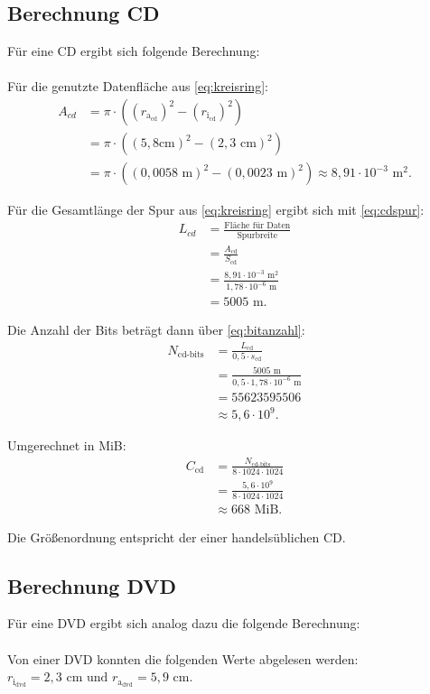\documentclass[9pt,twocolumn,twoside]{pnas-new}
\begin{document}
\subsection{Berechnung CD}
Für eine CD ergibt sich folgende Berechnung: \\ \\
Für die genutzte Datenfläche aus \eqref{eq:kreisring}:
\begin{align*}
 A_{cd} &= \pi\cdot((r_{\mbox{a}_{\mbox{cd}}})^2-(r_{\mbox{i}_{\mbox{cd}}})^2)\\	
&= \pi\cdot((5,8\mbox{cm})^2-(2,3\mbox{ cm})^2) \\
 &=  \pi\cdot((0,0058\mbox{ m})^2-(0,0023\mbox{ m})^2) \approx  8,91\cdot10^{-3}\mbox{ m}^2.
\end{align*}

Für die Gesamtlänge der Spur aus \eqref{eq:kreisring} ergibt sich mit \eqref{eq:cdspur}:
\begin{align*}
 L_{cd} &= \frac{\mbox{Fläche für Daten}}{\mbox{Spurbreite}}\\
 &= \frac{A_{\mbox{cd}}}{S_{\mbox{cd}}}\\
 &= \frac{8,91\cdot10^{-3}\mbox{ m}^2}{1,78\cdot10^{-6}\mbox{ m} }\\
 &= 5005\mbox{ m}.
\end{align*}

Die Anzahl der Bits beträgt dann über \eqref{eq:bitanzahl}:
\begin{align*}
N_{\mbox{cd-bits}} &=  \frac{L_{\mbox{cd}}}{0,5\cdot s_{\mbox{cd}}}\\
&= \frac{5005\mbox{ m}}{0,5 \cdot 1,78 \cdot 10^{-6}\mbox{ m}}\\
&= 55623595506 \\
&\approx 5,6 \cdot 10^9.
\end{align*}

Umgerechnet in MiB:
\begin{align*}
C_{\mbox{cd}} &= \frac{N_{\mbox{cd-bits}}}{8\cdot1024\cdot1024}\\
&= \frac{ 5,6\cdot10^9}{8\cdot1024\cdot1024}\\
&\approx 668\mbox{ MiB}.
\end{align*}

Die Größenordnung entspricht der einer handelsüblichen CD.

\subsection{Berechnung DVD}
Für eine DVD ergibt sich analog dazu die folgende Berechnung: \\ \\
Von einer DVD konnten die folgenden Werte abgelesen werden: \begin{math} r_{\mbox{i}_{\mbox{dvd}}} = 2,3 \mbox{ cm und } r_{\mbox{a}_{\mbox{dvd}}} = 5,9 \mbox{ cm} \end{math}. \\
\end{document}
